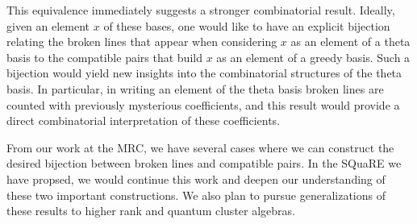 \documentclass{amsart}
\begin{document}
    This equivalence immediately suggests a stronger combinatorial result.
    Ideally, given an element $x$ of these bases, one would like to have an
    explicit bijection relating the broken lines that appear when considering
    $x$ as an element of a theta basis to the compatible pairs that build $x$ as
    an element of a greedy basis.
    Such a bijection would yield new insights into the combinatorial structures
    of the theta basis.
    In particular, in writing an element of the theta basis broken lines are
    counted with previously mysterious coefficients, and this result would
    provide a direct combinatorial interpretation of these coefficients.
    
    From our work at the MRC, we have several cases where we can construct the
    desired bijection between broken lines and compatible pairs.
    In the SQuaRE we have propsed, we would continue this work and deepen our
    understanding of these two important constructions.
    We also plan to pursue generalizations of these results to higher rank and
    quantum cluster algebras.
\end{document}
